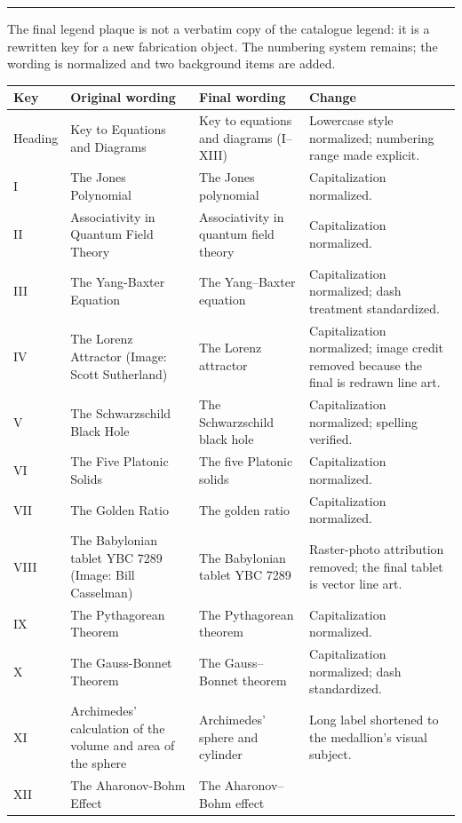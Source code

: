 \documentclass[10pt]{article}
\newcommand{\head}[1]{\par\vspace{7pt}{\noindent\large\bfseries #1}\par
  \vspace{1pt}\noindent\rule{\linewidth}{0.4pt}\par\vspace{2pt}}
\begin{document}
\vspace{10pt}
\head{Appendix B\quad Legend changes: original $\rightarrow$ final}
The final legend plaque is not a verbatim copy of the catalogue legend:
it is a rewritten key for a new fabrication object. The numbering
system remains; the wording is normalized and two background items are
added.

\renewcommand{\arraystretch}{1.22}
\begin{longtable}{@{}L{1.35cm} L{4.55cm} L{4.55cm} L{5.2cm}@{}}
\toprule
\textbf{Key} & \textbf{Original wording} & \textbf{Final wording} & \textbf{Change}\\
\midrule
\endhead
Heading & Key to Equations and Diagrams & Key to equations and diagrams
  (I--XIII) & Lowercase style normalized; numbering range made explicit.\\
I & The Jones Polynomial & The Jones polynomial & Capitalization normalized.\\
II & Associativity in Quantum Field Theory & Associativity in quantum
  field theory & Capitalization normalized.\\
III & The Yang-Baxter Equation & The Yang--Baxter equation &
  Capitalization normalized; dash treatment standardized.\\
IV & The Lorenz Attractor (Image: Scott Sutherland) & The Lorenz
  attractor & Capitalization normalized; image credit removed because
  the final is redrawn line art.\\
V & The Schwarzschild Black Hole & The Schwarzschild black hole &
  Capitalization normalized; spelling verified.\\
VI & The Five Platonic Solids & The five Platonic solids &
  Capitalization normalized.\\
VII & The Golden Ratio & The golden ratio & Capitalization normalized.\\
VIII & The Babylonian tablet YBC 7289 (Image: Bill Casselman) & The
  Babylonian tablet YBC 7289 & Raster-photo attribution removed; the
  final tablet is vector line art.\\
IX & The Pythagorean Theorem & The Pythagorean theorem &
  Capitalization normalized.\\
X & The Gauss-Bonnet Theorem & The Gauss--Bonnet theorem &
  Capitalization normalized; dash standardized.\\
XI & Archimedes' calculation of the volume and area of the sphere &
  Archimedes' sphere and cylinder & Long label shortened to the
  medallion's visual subject.\\
XII & The Aharonov-Bohm Effect & The Aharonov--Bohm effect &

\end{longtable}
\end{document}
